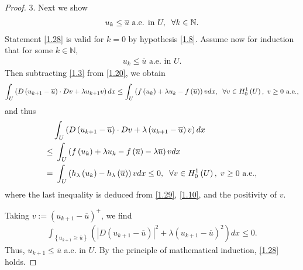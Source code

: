 \documentclass[11pt,a4paper,center,notitlepage]{article}
\numberwithin{equation}{section}
\begin{document}
\begin{proof}
3. Next we show 
\begin{align}
\label{1.28}
u_k \le \overline{u} \mbox{ a.e. in } U, \hspace{2mm} \forall k\in \mathbb{N}.
\end{align}
Statement \eqref{1.28} is valid for $k=0$ by hypothesis \eqref{1.8}. Assume now for induction that for some $k\in \mathbb{N}$,
\begin{align}
\label{1.29}
u_k \le \overline{u} \mbox{ a.e. in } U.
\end{align}
Then subtracting \eqref{1.3} from \eqref{1.20}, we obtain
\begin{align*}
\int_U {\left( {D\left( {{u_{k + 1}} - \overline u } \right) \cdot Dv + \lambda {u_{k + 1}}v} \right)dx}  \le \int_U {\left( {f\left( {{u_k}} \right) + \lambda {u_k} - f\left( {\overline u } \right)} \right)vdx} ,\hspace{2mm}\forall v \in H_0^1\left( U \right),\hspace{1mm}v \ge 0 \mbox{ a.e.},
\end{align*}
and thus
\begin{align}
& \int_U {\left( {D\left( {{u_{k + 1}} - \overline u } \right) \cdot Dv + \lambda \left( {{u_{k + 1}} - \overline u } \right)v} \right)dx}  \\
\le &\ \int_U {\left( {f\left( {{u_k}} \right) + \lambda {u_k} - f\left( {\overline u } \right) - \lambda \overline u } \right)vdx} \\
 =&\ \int_U {\left( {{h_\lambda }\left( {{u_k}} \right) - {h_\lambda }\left( {\overline u } \right)} \right)vdx}\le 0 ,\hspace{2mm} \forall v \in H_0^1\left( U \right) ,\hspace{1mm}v \ge 0 \mbox{ a.e.},
\end{align}
where the last inequality is deduced from \eqref{1.29}, \eqref{1.10}, and the positivity of $v$.

Taking $v:= \left(u_{k+1} -\overline{u}\right) ^+$, we find
\begin{align}
\int_{\left\{ {{u_{k + 1}} \ge \overline u } \right\}} {\left( {{{\left| {D\left( {{u_{k + 1}} - \overline u } \right)} \right|}^2} + \lambda {{\left( {{u_{k + 1}} - \overline u } \right)}^2}} \right)dx}  \le 0.
\end{align}
Thus, $u_{k+1}\le \overline{u}$ a.e. in $U$. By the principle of mathematical induction, \eqref{1.28} holds. 


\end{proof}
\end{document}
